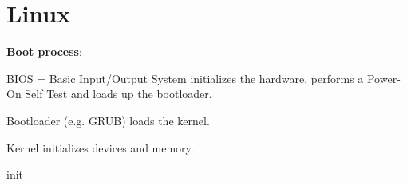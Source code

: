 \section{Linux}
\textbf{Boot process}:
\begin{enumx}
	\item BIOS = Basic Input/Output System initializes the hardware, performs a Power-On Self Test and loads up the bootloader.
	\item Bootloader (e.g. GRUB) loads the kernel.
	\item Kernel initializes devices and memory.
	\item init
\end{enumx}
